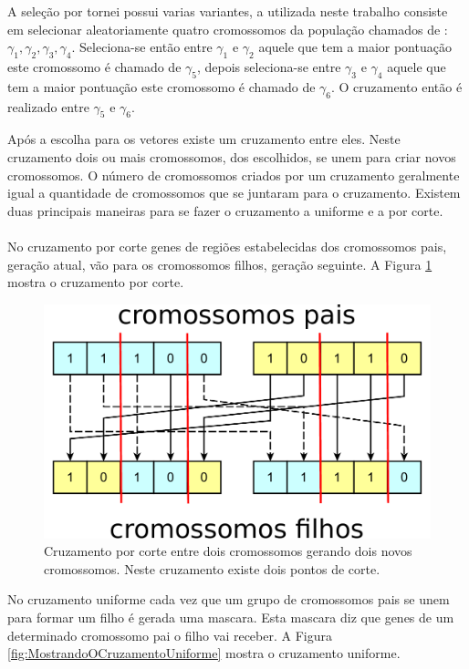 \documentclass[10pt,a4paper]{article}
\begin{document}
 
A seleção por tornei possui varias variantes, a utilizada neste trabalho consiste em selecionar aleatoriamente quatro cromossomos da população chamados de : $\gamma_{1},\gamma_{2},\gamma_{3},\gamma_{4}$. Seleciona-se então entre $\gamma_{1}$ e $\gamma_{2}$ aquele que tem a maior pontuação este cromossomo é chamado de $\gamma_{5}$, depois seleciona-se  entre $\gamma_{3}$ e $\gamma_{4}$ aquele que tem a maior pontuação este cromossomo é chamado de $\gamma_{6}$. O cruzamento então é realizado entre $\gamma_{5}$ e $\gamma_{6}$. 


Após a escolha para os vetores existe um cruzamento entre eles. Neste cruzamento dois ou mais cromossomos, dos escolhidos, se unem para criar novos cromossomos. O número de cromossomos criados por um cruzamento geralmente igual a quantidade de cromossomos que se juntaram para o cruzamento. Existem duas principais maneiras para se fazer o cruzamento a uniforme e a por corte. \\ \\
No cruzamento por corte genes de regiões estabelecidas dos cromossomos pais, geração atual, vão para os cromossomos filhos, geração seguinte. A Figura \ref{fig:MostrandoOCruzamentoPorCorte} mostra o cruzamento por corte. 

\begin{figure}[H]
  \center
  \includegraphics[scale=0.6]{imgs/diagramaCorte.pdf}            
  \caption{Cruzamento por corte entre dois cromossomos gerando dois novos cromossomos. Neste cruzamento existe dois pontos de corte.}
  \label{fig:MostrandoOCruzamentoPorCorte}
\end{figure} 

No cruzamento uniforme cada vez que um grupo de cromossomos pais se unem para formar um filho é gerada uma mascara. Esta mascara diz que genes de um determinado cromossomo pai o filho vai receber. A Figura \ref{fig:MostrandoOCruzamentoUniforme} mostra o cruzamento uniforme. 
\end{document}
